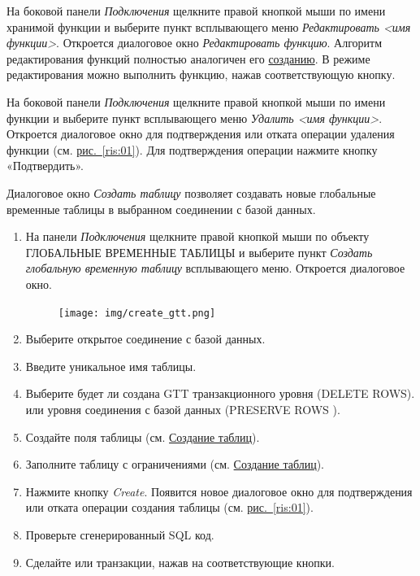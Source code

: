 На боковой панели \textit{Подключения} щелкните правой кнопкой мыши по имени хранимой функции и выберите пункт всплывающего меню \textit{Редактировать <имя функции>}. Откроется диалоговое окно \textit{Редактировать функцию}. Алгоритм редактирования функций полностью аналогичен его \hyperref[sec:crfunc]{созданию}.
В режиме редактирования можно выполнить функцию, нажав соответствующую кнопку.

На боковой панели \textit{Подключения} щелкните правой кнопкой мыши по имени функции и выберите пункт всплывающего меню \textit{Удалить <имя функции>}. Откроется  диалоговое окно для подтверждения или отката операции удаления функции (см. \hyperref[ris:01]{рис.~\ref{ris:01}}). Для подтверждения операции нажмите кнопку «Подтвердить».



Диалоговое окно \textit{Создать таблицу} позволяет создавать новые глобальные временные таблицы в выбранном соединении с базой данных.

\begin{enumerate}[leftmargin=26pt]
	\item На панели \textit{Подключения} щелкните правой кнопкой мыши по объекту ГЛОБАЛЬНЫЕ ВРЕМЕННЫЕ ТАБЛИЦЫ и выберите пункт \textit{Создать глобальную временную таблицу} всплывающего меню. Откроется диалоговое окно.
	\begin{figure}[H]
		\centering
		\texttt{[image: img/create\_gtt.png]}
	\end{figure}
	\item Выберите открытое соединение с базой данных.
	\item Введите уникальное имя таблицы.
	\item Выберите будет ли создана GTT транзакционного уровня (DELETE ROWS). или уровня соединения с базой данных (PRESERVE ROWS ).
	\item Создайте поля таблицы (см. \hyperref[sec:111]{Создание таблиц}).
	\item Заполните таблицу с ограничениями (см. \hyperref[sec:111]{Создание таблиц}).
	\item Нажмите кнопку \textit{Create}. Появится новое диалоговое окно для подтверждения или отката операции создания таблицы (см. \hyperref[ris:01]{рис.~\ref{ris:01}}).
	\item Проверьте сгенерированный SQL код.
	\item Сделайте  или  транзакции, нажав на соответствующие кнопки.
\end{enumerate}

